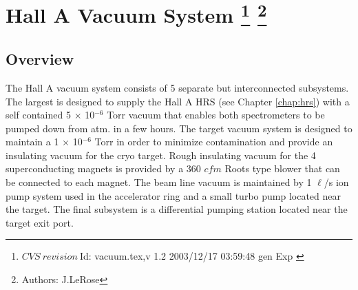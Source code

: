 \chapter[Hall A Vacuum System]{Hall A Vacuum System
\footnote{
  $CVS~revision~ $Id: vacuum.tex,v 1.2 2003/12/17 03:59:48 gen Exp $ $ 
}
\footnote{Authors: J.LeRose }
}
\label{chap:vacuum}
\section{Overview}

The Hall A vacuum system consists of 5 separate but interconnected 
subsystems.  The largest is designed to supply 
the Hall A HRS (see Chapter \ref{chap:hrs}) with a 
self contained 5 $\times$ 10$^{-6}$ Torr vacuum that enables both 
spectrometers to be pumped down from atm. in a few hours.  The target 
vacuum system is designed to maintain a 1 $\times$ 10$^{-6}$ Torr in 
order to minimize contamination and provide an insulating vacuum for the 
cryo target.  Rough insulating vacuum for the 4 superconducting magnets 
is provided by a 360 $cfm$ Roots type blower that can be connected to each 
magnet.  The beam line vacuum is maintained by 1 $\ell$/s ion pump 
system used in the accelerator ring and a small turbo pump located near 
the target.  The final subsystem is a differential pumping station 
located near the target exit port.

